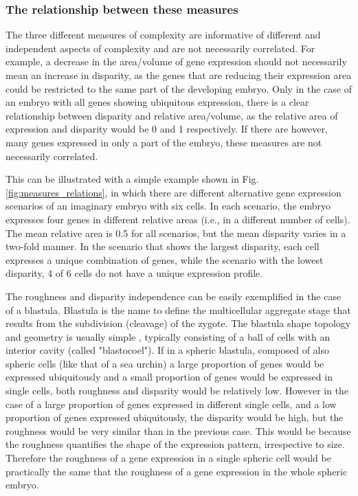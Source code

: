 \subsubsection{The relationship between these measures}

The three different measures of complexity are informative of different and independent aspects of complexity and are not necessarily correlated. 
For example, a decrease in the area/volume of gene expression should not necessarily mean an increase in disparity, as the genes that are reducing their expression area could be restricted to the same part of the developing embryo. 
Only in the case of an embryo with all genes showing ubiquitous expression, there is a clear relationship between disparity and relative area/volume, as the relative area of expression and disparity would be 0 and 1 respectively. If there are however, many genes expressed in only a part of the embryo, these measures are not necessarily correlated. 

This can be illustrated with a simple example shown in Fig. \ref{fig:measures_relations}, in which there are different alternative gene expression scenarios of an imaginary embryo with six cells. In each scenario, the embryo expresses four genes in different relative areas (i.e., in a different number of cells). The mean relative area is 0.5 for all scenarios, but the mean disparity varies in a two-fold manner. In the scenario that shows the largest disparity, each cell expresses a unique combination of genes, while the scenario with the lowest disparity, 4 of 6 cells do not have a unique expression profile.

The roughness and disparity independence can be easily exemplified in the case of a blastula. Blastula is the name to define the multicellular aggregate stage that results from the subdivision (cleavage) of the zygote. The blastula shape topology and geometry is usually simple \citep{Forgacs_Newman2005}, typically consisting of a ball of cells with an interior cavity (called "blastocoel"). If in a spheric blastula, composed of also spheric cells (like that of a sea urchin) a large proportion of genes would be expressed ubiquitously and a small proportion of genes would be expressed in single cells, both roughness and disparity would be relatively low.
However in the case of a large proportion of genes expressed in different single cells, and a low proportion of genes expressed ubiquitously, the disparity would be high, but the roughness would be very similar than in the previous case. This would be because the roughness quantifies the shape of the expression pattern, irrespective to size. Therefore the roughness of a gene expression in a single spheric cell would be practically the same that the roughness of a gene expression in the whole spheric embryo.

